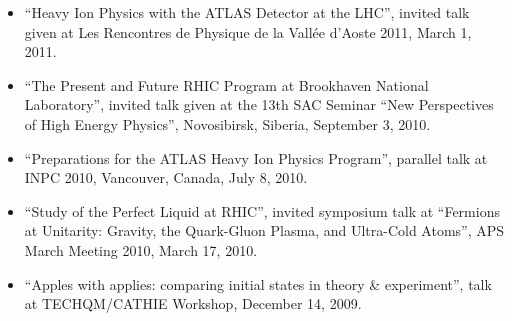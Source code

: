 \documentclass[11 pt]{article}
\begin{document}
\begin{description}
\begin{itemize}
\item ``Heavy Ion Physics with the ATLAS Detector at the LHC'', invited talk given at Les Rencontres de Physique de la Vall\'ee d'Aoste 2011, March 1, 2011.
\item ``The Present and Future RHIC Program at Brookhaven National Laboratory'', invited talk given at the 13th SAC Seminar ``New Perspectives of High Energy Physics'', Novosibirsk, Siberia, September 3, 2010.
\item ``Preparations for the ATLAS Heavy Ion Physics Program'', parallel talk at INPC 2010, Vancouver, Canada, July 8, 2010.
\item ``Study of the Perfect Liquid at RHIC'', invited symposium talk at ``Fermions at Unitarity: Gravity, the Quark-Gluon Plasma, and Ultra-Cold Atoms'', APS March Meeting 2010, March 17, 2010. 
\item ``Apples with applies: comparing initial states in theory \& experiment'', talk at TECHQM/CATHIE Workshop, December 14, 2009.


\end{itemize}
\end{description}
\end{document}
